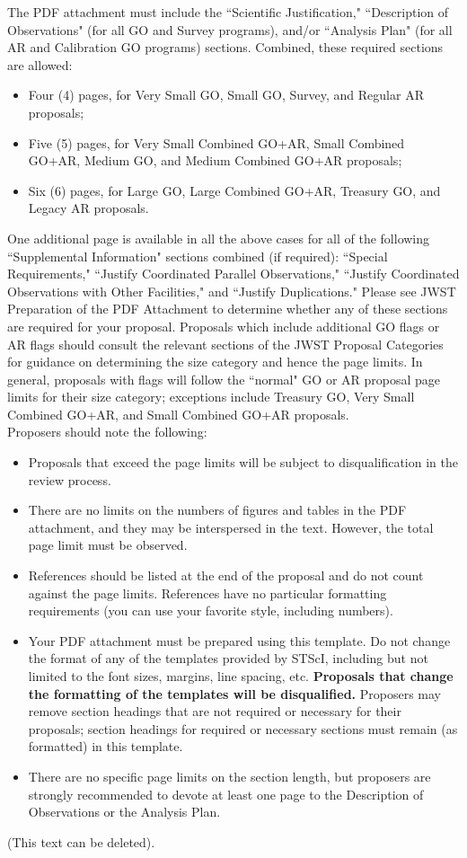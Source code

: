 \documentclass[12pt]{article}
\begin{document}
\noindent The PDF attachment must include the ``Scientific Justification," ``Description of Observations" (for all GO and Survey programs), and/or ``Analysis Plan" (for all AR and Calibration GO programs) sections. Combined, these required sections are allowed:
\begin{itemize}\itemsep0em
\item Four (4) pages, for Very Small GO, Small GO, Survey, and Regular AR proposals;  
\item Five (5) pages, for Very Small Combined GO+AR, Small Combined GO+AR, Medium GO, and Medium Combined GO+AR proposals;  
\item Six (6) pages, for Large GO, Large Combined GO+AR, Treasury GO, and Legacy AR proposals.
\end{itemize}
One additional page is available in all the above cases for all of the following ``Supplemental Information" sections combined (if required): ``Special Requirements," ``Justify Coordinated Parallel Observations," ``Justify Coordinated Observations with Other Facilities," and ``Justify Duplications." Please see JWST Preparation of the PDF Attachment to determine whether any of these sections are required for your proposal. 
Proposals which include additional GO flags or AR flags should consult the relevant sections of the JWST Proposal Categories for guidance on determining the size category and hence the page limits. In general, proposals with flags will follow the ``normal" GO or AR proposal page limits for their size category; exceptions include Treasury GO, Very Small Combined GO+AR, and Small Combined GO+AR proposals.\\

\noindent Proposers should note the following:
\begin{itemize}\itemsep0em
\item Proposals that exceed the page limits will be subject to disqualification in the review process.
\item There are no limits on the numbers of figures and tables in the PDF attachment, and they may be interspersed in the text. However, the total page limit must be observed.
\item References should be listed at the end of the proposal and do not count against the page limits. References have no particular formatting requirements (you can use your favorite style, including numbers).
\item Your PDF attachment must be prepared using this template. Do not change the format of any of the templates provided by STScI, including but not limited to the font sizes, margins, line spacing, etc. {\bf Proposals that change the formatting of the templates will be disqualified.} Proposers may remove section headings that are not required or necessary for their proposals; section headings for required or necessary sections must remain (as formatted) in this template.
\item There are no specific page limits on the section length, but proposers are strongly recommended to devote at least one page to the Description of Observations or the Analysis Plan.
\end{itemize}
(This text can be deleted). 
\end{document}
